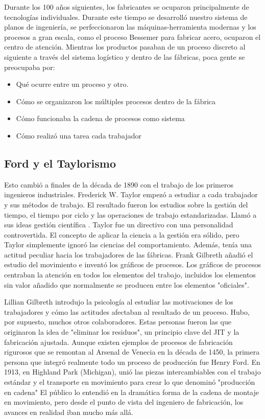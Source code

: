Durante los 100 años siguientes, los fabricantes se ocuparon principalmente de tecnologías individuales.
Durante este tiempo se desarrolló nuestro sistema de planos de ingeniería, se perfeccionaron las máquinas-herramienta modernas y los procesos a gran escala, como el proceso Bessemer para fabricar acero, ocuparon el centro de atención.
Mientras los productos pasaban de un proceso discreto al siguiente a través del sistema logístico y dentro de las fábricas, poca gente se preocupaba por:

\begin{itemize}
    \item Qué ocurre entre un proceso y otro.
    \item Cómo se organizaron los múltiples procesos dentro de la fábrica
    \item Cómo funcionaba la cadena de procesos como sistema
    \item Cómo realizó una tarea cada trabajador
\end{itemize}

\subsection{Ford y el Taylorismo}

Esto cambió a finales de la década de 1890 con el trabajo de los primeros ingenieros industriales.
Frederick W. Taylor empezó a estudiar a cada trabajador y sus métodos de trabajo.
El resultado fueron los estudios sobre la gestión del tiempo, el tiempo por ciclo y las operaciones de trabajo estandarizadas.
Llamó a sus ideas gestión científica \cite{hounshell_same_1988}.
Taylor fue un directivo con una personalidad controvertida.
El concepto de aplicar la ciencia a la gestión era sólido, pero Taylor simplemente ignoró las ciencias del comportamiento.
Además, tenía una actitud peculiar hacia los trabajadores de las fábricas.
Frank Gilbreth añadió el estudio del movimiento e inventó los gráficos de procesos.
Los gráficos de procesos centraban la atención en todos los elementos del trabajo, incluidos los elementos sin valor añadido que normalmente se producen entre los elementos "oficiales".

Lillian Gilbreth introdujo la psicología al estudiar las motivaciones de los trabajadores y cómo las actitudes afectaban al resultado de un proceso.
Hubo, por supuesto, muchos otros colaboradores.
Estas personas fueron las que originaron la idea de "eliminar los residuos", un principio clave del JIT y la fabricación ajustada.
Aunque existen ejemplos de procesos de fabricación rigurosos que se remontan al Arsenal de Venecia en la década de 1450, la primera persona que integró realmente todo un proceso de producción fue Henry Ford.
En 1913, en Highland Park (Michigan), unió las piezas intercambiables con el trabajo estándar y el transporte en movimiento para crear lo que denominó "producción en cadena"
El público lo entendió en la dramática forma de la cadena de montaje en movimiento, pero desde el punto de vista del ingeniero de fabricación, los avances en realidad iban mucho más allá.

